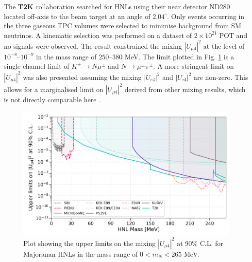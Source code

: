 \begin{coloritemize}
\item The \textbf{T2K} collaboration searched for HNLs using their near detector ND280 located off-axis to the beam target at an angle of $2.04^\circ$.
Only events occurring in the three gaseous TPC volumes were selected to minimise background from SM neutrinos.
A kinematic selection was performed on a dataset of $2\times10^{21}$ POT and no signals were observed.
The result constrained the mixing $|U_{\mu4}|^2$ at the level of $10^{-8}$--$10^{-9}$ in the mass range of $250$--$380$ MeV. 
The limit plotted in Fig. \ref{fig:sensitivity_theory} is a single-channel limit of $K^\pm \rightarrow N\mu^\pm$ and $N \rightarrow \mu^\pm\pi^\pm$.
A more stringent limit on $|U_{\mu4}|^2$ was also presented assuming the mixing $|U_{e4}|^2$ and $|U_{\tau4}|^2$ are non-zero.
This allows for a marginalised limit on $|U_{\mu4}|^2$ derived from other mixing results, which is not directly comparable here \cite{t2k}.

\begin{figure}[t!] 
\centering    
\includegraphics[width=1.0\textwidth]{sensitivity}
\caption[Experimental Upper Limits on The Mixing $|U_{\mu4}|^{2}$ of Heavy Neutral Leptons]{
Plot showing the upper limits on the mixing $|U_{\mu4}|^{2}$ at 90\% C.L. for Majoranan HNLs in the mass range of $0 < m_{N} < 265$ MeV.
}
\label{fig:sensitivity_theory}
\end{figure}


\end{coloritemize}
